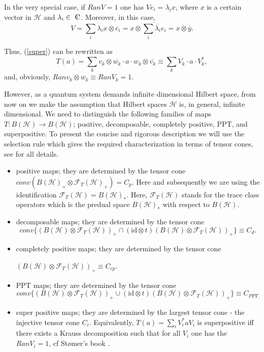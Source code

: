 \documentclass{amsart}
\theoremstyle{plain}
\theoremstyle{definition}
\newcommand{\id}{\mathrm{id}}
\newcommand{\cH}{\mathcal{H}}
\newcommand{\Cn}{{\setbox0=\hbox{
$\displaystyle\rm C$}\hbox{\hbox
to0pt{\kern0.6\wd0\vrule height0.9\ht0\hss}\box0}}} %
\begin{document}
In the very special case, if $Ran V = 1$ one has $Ve_i = \lambda_i x$, where $x$ is a certain vector in $\cH$ and $\lambda_i \in \Cn$. Moreover, in this case,
\begin{equation}
V = \sum_i \lambda_i x \otimes \overline{e_i} = x \otimes \overline{\sum_i \overline{\lambda_i} e_i} = x \otimes \overline{y}.
\end{equation}
  
Thus,  (\ref{super}) can be rewritten as
\begin{equation}
\label{super2}
T(a) = \sum_k v_k \otimes \overline{w_k} \cdot a \cdot w_k \otimes \overline{v_k} \equiv \sum_k V_k \cdot a \cdot V^*_k,
\end{equation}
and, obviously, $Ran v_k \otimes \overline{w_k} \equiv Ran V_k = 1$.


However, as a quantum system demands infinite dimensional Hilbert space, from now on we make the assumption that Hilbert spaces $\cH$ is, in general, infinite dimensional.
We need to distinguish the following families of maps $T: B(\cH) \to B(\cH)$;  positive, decomposable, completely positive, PPT, and superpositive. To present the concise and rigorous description we will use the selection rule which gives the required characterization in terms of tensor cones, see \cite{Maj} for all details.

\begin{itemize}
\item positive maps; they are determined by the tensor cone 
$conv\left(B(\cH)_+ \otimes \mathcal{F}_T(\cH)_+\right) = C_p$. Here and subsequently we are using the identification $\mathcal{F}_T(\cH) = B(\cH)_*$. Here,  $\mathcal{F}_T(\cH)$ stands for the trace class operators which is the predual space $B(\cH)_*$ with respect to $B(\cH)$.
\item decomposable maps; they are determined by the tensor cone 
$$conv\{ \left(B(\cH) \otimes \mathcal{F}_T(\cH) \right)_+ \cap \left(\id\otimes t \right) \left(B(\cH) \otimes \mathcal{F}_T(\cH) \right)_+\} \equiv C_d.$$
\item completely positive maps; they are determined by the tensor cone 

$\left(B(\cH) \otimes \mathcal{F}_T(\cH) \right)_+ \equiv C_{cp}$.
\item PPT maps; they are determined by the tensor cone 
$$conv\{\left(B(\cH) \otimes \mathcal{F}_T(\cH) \right)_+ \cup \left(\id\otimes t\right) \left(B(\cH) \otimes \mathcal{F}_T(\cH) \right)_+\} \equiv C_{PPT.}$$
\item super positive maps; they are determined by the largest tensor cone - the injective tensor cone $C_i$.
Equivalently, $T(a) = \sum_i V^*_i a V_i$ is superpositive iff there exists a Krauss decomposition such that for all $V_i$ one has the $Ran V_i = 1$, cf St{\o}mer's book \cite{Ster}.
\end{itemize}
 
\end{document}
